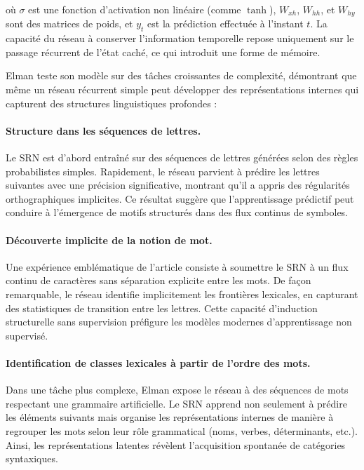 \documentclass[12pt]{report}
\begin{document}
où $\sigma$ est une fonction d’activation non linéaire (comme $\tanh$), $W_{xh}$, $W_{hh}$, et $W_{hy}$ sont des matrices de poids, et $y_t$ est la prédiction effectuée à l’instant $t$. La capacité du réseau à conserver l’information temporelle repose uniquement sur le passage récurrent de l’état caché, ce qui introduit une forme de mémoire.

Elman teste son modèle sur des tâches croissantes de complexité, démontrant que même un réseau récurrent simple peut développer des représentations internes qui capturent des structures linguistiques profondes :

\paragraph{Structure dans les séquences de lettres.} Le SRN est d’abord entraîné sur des séquences de lettres générées selon des règles probabilistes simples. Rapidement, le réseau parvient à prédire les lettres suivantes avec une précision significative, montrant qu’il a appris des régularités orthographiques implicites. Ce résultat suggère que l’apprentissage prédictif peut conduire à l’émergence de motifs structurés dans des flux continus de symboles.

\paragraph{Découverte implicite de la notion de mot.} Une expérience emblématique de l’article consiste à soumettre le SRN à un flux continu de caractères sans séparation explicite entre les mots. De façon remarquable, le réseau identifie implicitement les frontières lexicales, en capturant des statistiques de transition entre les lettres. Cette capacité d’induction structurelle sans supervision préfigure les modèles modernes d’apprentissage non supervisé.

\paragraph{Identification de classes lexicales à partir de l’ordre des mots.} Dans une tâche plus complexe, Elman expose le réseau à des séquences de mots respectant une grammaire artificielle. Le SRN apprend non seulement à prédire les éléments suivants mais organise les représentations internes de manière à regrouper les mots selon leur rôle grammatical (noms, verbes, déterminants, etc.). Ainsi, les représentations latentes révèlent l’acquisition spontanée de catégories syntaxiques.
\end{document}

